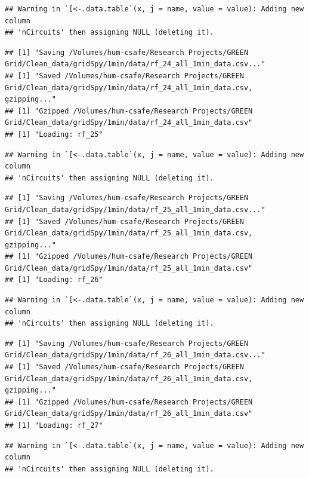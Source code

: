\documentclass[]{article}
\begin{document}
\begin{verbatim}
## Warning in `[<-.data.table`(x, j = name, value = value): Adding new column
## 'nCircuits' then assigning NULL (deleting it).
\end{verbatim}

\begin{verbatim}
## [1] "Saving /Volumes/hum-csafe/Research Projects/GREEN Grid/Clean_data/gridSpy/1min/data/rf_24_all_1min_data.csv..."
## [1] "Saved /Volumes/hum-csafe/Research Projects/GREEN Grid/Clean_data/gridSpy/1min/data/rf_24_all_1min_data.csv, gzipping..."
## [1] "Gzipped /Volumes/hum-csafe/Research Projects/GREEN Grid/Clean_data/gridSpy/1min/data/rf_24_all_1min_data.csv"
## [1] "Loading: rf_25"
\end{verbatim}

\begin{verbatim}
## Warning in `[<-.data.table`(x, j = name, value = value): Adding new column
## 'nCircuits' then assigning NULL (deleting it).
\end{verbatim}

\begin{verbatim}
## [1] "Saving /Volumes/hum-csafe/Research Projects/GREEN Grid/Clean_data/gridSpy/1min/data/rf_25_all_1min_data.csv..."
## [1] "Saved /Volumes/hum-csafe/Research Projects/GREEN Grid/Clean_data/gridSpy/1min/data/rf_25_all_1min_data.csv, gzipping..."
## [1] "Gzipped /Volumes/hum-csafe/Research Projects/GREEN Grid/Clean_data/gridSpy/1min/data/rf_25_all_1min_data.csv"
## [1] "Loading: rf_26"
\end{verbatim}

\begin{verbatim}
## Warning in `[<-.data.table`(x, j = name, value = value): Adding new column
## 'nCircuits' then assigning NULL (deleting it).
\end{verbatim}

\begin{verbatim}
## [1] "Saving /Volumes/hum-csafe/Research Projects/GREEN Grid/Clean_data/gridSpy/1min/data/rf_26_all_1min_data.csv..."
## [1] "Saved /Volumes/hum-csafe/Research Projects/GREEN Grid/Clean_data/gridSpy/1min/data/rf_26_all_1min_data.csv, gzipping..."
## [1] "Gzipped /Volumes/hum-csafe/Research Projects/GREEN Grid/Clean_data/gridSpy/1min/data/rf_26_all_1min_data.csv"
## [1] "Loading: rf_27"
\end{verbatim}

\begin{verbatim}
## Warning in `[<-.data.table`(x, j = name, value = value): Adding new column
## 'nCircuits' then assigning NULL (deleting it).
\end{verbatim}
\end{document}
